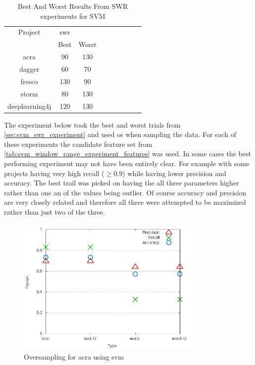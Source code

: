 \begin{table}[ht]
\begin{center}

    \begin{tabular}{|c|c|c|c|c|c|c|c|c|}
        \hline
        Project & \multicolumn{1}{c}{\gls{swr}} & \\
         & \multicolumn{1}{c}{Best} & \multicolumn{1}{c|}{Worst} \\
         \hline
        acra & 90 & 130 \\
        dagger & 60 & 70 \\
        fresco & 130 & 90 \\
        storm & 80 & 130 \\
        deeplearning4j & 120 & 130 \\ \hline
    \end{tabular}
    \caption{Best And Worst Results From SWR experiments for SVM}
    \label{tab:svm_best_worst_swr_experiment_sets}
\end{center}
\end{table}

The experiment below took the best and worst trials from \autoref{sec:svm_swr_experiment} and used \gls{os} when sampling the data. For each of these experiments the candidate feature set from \autoref{tab:svm_window_range_experiment_features} was used. In some cases the best performing experiment may not have been entirely clear. For example with some projects having very high recall ($ \geq 0.9$) while having lower precision and accuracy. The best trail was picked on having the all three parameters higher rather than one an of the values being outlier. Of course accuracy and precision are very closely related and therefore all three were attempted to be maximized rather than just two of the three.

\begin{figure}[!t]
    \centering

        \includegraphics[width=0.8\textwidth]{images/svm/test_4/acra_sample_range}
        \caption{Oversampling for acra using \gls{svm}}
        \label{fig:test_4_acra_svm}
\end{figure}


